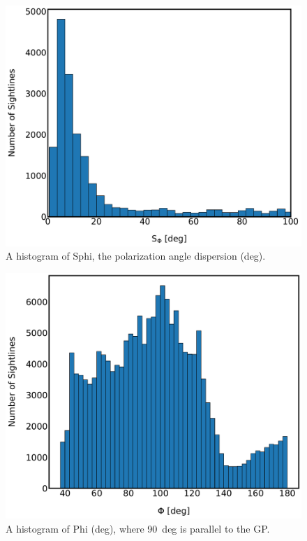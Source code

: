 \begin{figure}[!htbp]
\centering
\includegraphics[width=\textwidth]{figures/carina/S_hist}
\caption[A histogram of the dispersion in polarization angle.]{A histogram of \gls{Sphi}, the polarization angle dispersion (deg).}
\label{fig:S_hist}
\end{figure}

\begin{figure}[!htbp]
\centering
\includegraphics[width=\textwidth]{figures/carina/Phi_hist}
\caption[A histogram of the polarization angle.]{A histogram of \gls{Phi} (deg), where 90~deg is parallel to the GP.}
\label{fig:Phi_hist}
\end{figure}

